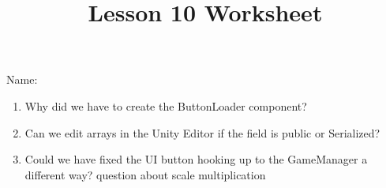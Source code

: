 \documentclass[12pt]{../rhitcsse}
\title{Lesson 10 Worksheet}
\begin{document}
\maketitle

\vspace*{0.15in}\hspace{0.25in}Name:\hrulefill\hspace{0.25in}\hspace{0.25in}

\begin{enumerate}
  \item Why did we have to create the ButtonLoader component?
  \vfill
  \item Can we edit arrays in the Unity Editor if the field is public or Serialized?
  \vfill
  \item Could we have fixed the UI button hooking up to the GameManager a different way?
  \vfill
  question about scale multiplication

\end{enumerate}
\end{document}
